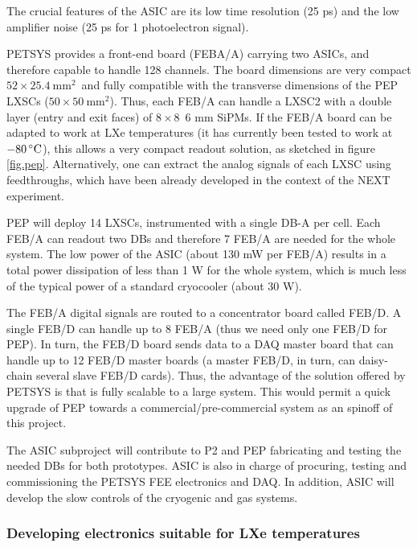The crucial features of the ASIC are its low time resolution (25 ps) and the low amplifier noise (25 ps for 1 photoelectron signal).

PETSYS provides a front-end board (FEBA/A) carrying two ASICs, and therefore capable to handle 128 channels. The board dimensions are very compact $52 \times 25.4 \mathrm{~mm^2}$~and fully compatible with the transverse dimensions of the PEP LXSCs ($50 \times 50 \mathrm{~mm^2}$). Thus, each FEB/A can handle a LXSC2 with a double
layer (entry and exit faces) of $8 \times 8$~6 mm SiPMs. If the FEB/A board can be adapted to work at LXe temperatures (it has currently been tested to work at $-80\,^{\circ}{\rm C}$), this allows a very compact readout solution,
as sketched in figure \ref{fig.pep}. Alternatively, one can extract the analog signals of each LXSC using feedthroughs, which have been already developed in the context of the NEXT experiment.

PEP will deploy 14 LXSCs, instrumented with a single DB-A per cell. Each FEB/A can readout two DBs and therefore 7 FEB/A are needed for the whole system. The low power of the ASIC (about 130 mW per FEB/A) results in a total power dissipation of less than 1 W for the whole system, which is much less of the typical power of a standard cryocooler (about 30 W).

The FEB/A digital signals are routed to a concentrator board called FEB/D. A single FEB/D can handle up to 8 FEB/A (thus we need only one FEB/D for PEP). In turn, the FEB/D board sends data to a DAQ master board that can handle up to 12 FEB/D master boards (a master FEB/D, in turn, can daisy-chain several slave FEB/D cards). Thus, the advantage of the solution offered by PETSYS is that is fully scalable to a large system. This would permit a quick upgrade of PEP towards a commercial/pre-commercial system as an spinoff of this project.

The ASIC subproject will contribute to P2 and PEP fabricating and testing the needed DBs for both prototypes. ASIC is also in charge of procuring, testing and commissioning the PETSYS FEE electronics and DAQ. In addition, ASIC will develop the slow controls of the cryogenic and gas systems.

\subsubsection*{Developing electronics suitable for LXe temperatures}

